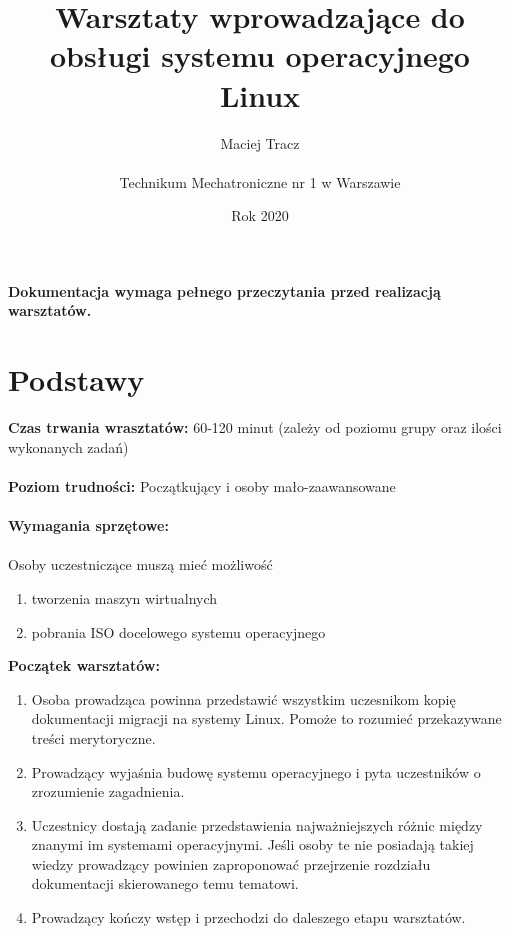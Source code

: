 \documentclass[10pt,a4paper]{article}
\begin{document}
\title{\Huge Warsztaty wprowadzające do obsługi systemu operacyjnego Linux}
\author{Maciej Tracz \\\\Technikum Mechatroniczne nr 1 w Warszawie}
\date{Rok 2020}
\maketitle

\textbf{Dokumentacja wymaga pełnego przeczytania przed realizacją warsztatów.}

\tableofcontents

\newpage

\section{Podstawy}

\textbf{Czas trwania wrasztatów:} 60-120 minut (zależy od poziomu grupy oraz ilości wykonanych zadań)\\\\
\textbf{Poziom trudności:} Początkujący i osoby mało-zaawansowane\\\\

\textbf{Wymagania sprzętowe:} \\\\ Osoby uczestniczące muszą mieć możliwość
\begin{enumerate}
\item tworzenia maszyn wirtualnych
\item pobrania ISO docelowego systemu operacyjnego\\
\end{enumerate}

\textbf{Początek warsztatów:}
\begin{enumerate}
\item Osoba prowadząca powinna przedstawić wszystkim uczesnikom kopię dokumentacji migracji na systemy Linux. Pomoże to rozumieć przekazywane treści merytoryczne.
\item Prowadzący wyjaśnia budowę systemu operacyjnego i pyta uczestników o zrozumienie zagadnienia.
\item Uczestnicy dostają zadanie przedstawienia najważniejszych różnic między znanymi im systemami operacyjnymi. Jeśli osoby te nie posiadają takiej wiedzy prowadzący powinien zaproponować przejrzenie rozdziału dokumentacji skierowanego temu tematowi.
\item Prowadzący kończy wstęp i przechodzi do daleszego etapu warsztatów.
\end{enumerate}
\end{document}
